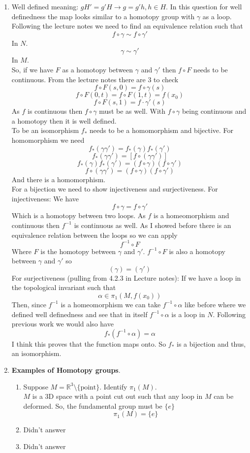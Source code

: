 \documentclass[12pt]{article}
\begin{document}
\begin{enumerate}
\item 
Well defined meaning: $gH' = g'H \rightarrow g = g'h, h \in H$. In this question for well definedness the map looks similar to a homotopy group with $\gamma$ as a loop. Following the lecture notes we need to find an equivalence relation such that 
$$ f \circ \gamma \sim f \circ \gamma' $$
In $N$. 
$$ \gamma \sim \gamma' $$
In $M$. \\
So, if we have $F$ as a homotopy between $\gamma$ and $\gamma'$ then $f \circ F$ needs to be continuous. From the lecture notes there are 3 to check
$$ f \circ F(s,0) = f \circ \gamma(s) $$
$$ f \circ F(0,t) = f \circ F(1,t) = f(x_0)$$
$$ f \circ F(s,1) = f \cdot \gamma'(s) $$
As $f$ is continuous then $f \circ \gamma$ must be as well. With $f \circ \gamma$ being continuous and a homotopy then it is well defined. 
\\
To be an isomorphism $f_*$ needs to be a homomorphism and bijective. For homomorphism we need 
$$ f_* (\gamma \gamma') = f_* (\gamma) f_* (\gamma') $$
$$ f_* (\gamma \gamma') = [f \circ (\gamma \gamma')] $$
$$ f_*(\gamma) f_*(\gamma') = (f \circ \gamma)(f \circ \gamma') $$
$$ f \circ (\gamma \gamma') = (f \circ \gamma)(f \circ \gamma') $$
And there is a homomorphism. \\
For a bijection we need to show injectiveness and surjectiveness. For injectiveness: We have 
$$ f \circ \gamma = f \circ \gamma' $$ 
Which is a homotopy between two loops. As $f$ is a homeomorphism and continuous then $f^{-1}$ is continuous as well. As I showed before there is an equivalence relation between the loops so we can apply 
$$ f^{-1} \circ F $$ 
Where $F$ is the homotopy between $\gamma$ and $\gamma'$. $f^{-1} \circ F$ is also a homotopy between $\gamma$ and $\gamma'$ so 
$$ (\gamma ) = (\gamma') $$
For surjectiveness (pulling from 4.2.3 in Lecture notes): If we have a loop in the topological invariant such that 
$$ \alpha \in \pi_1 (M, f(x_0)) $$
Then, since $f^{-1}$ is a homeomorphism we can take $ f^{-1} \circ \alpha$ like before where we defined well definedness and see that in itself $f^{-1} \circ \alpha$ is a loop in $N$. Following previous work we would also have 
$$ f_*(f^{-1} \circ \alpha) = \alpha $$ 
I think this proves that the function maps onto. So $f_*$ is a bijection and thus, an isomorphism. 

\item {\bf Examples of Homotopy groups}. 
\begin{enumerate}
\item Suppose $M=\mathbb{R}^3\setminus\{\mbox{point}\}$. Identify $\pi_1(M)$.
\\
$M$ is a 3D space with a point cut out such that any loop in $M$ can be deformed. So, the fundamental group must be $\{e\}$ 
$$ \pi_1 (M) = \{e\}$$ 
\item Didn't answer
\item Didn't answer
\end{enumerate}

\end{enumerate}
\end{document}
